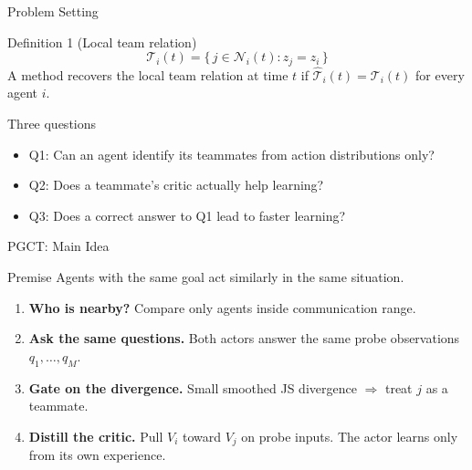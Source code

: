 \documentclass{beamer}
\begin{document}
\begin{frame}{Problem Setting}
  \begin{block}{Definition 1 (Local team relation)}
    \[
      \mathcal{T}_i(t) = \{\, j \in \mathcal{N}_i(t) : z_j = z_i \,\}
    \]
    A method recovers the local team relation at time $t$ if $\hat{\mathcal{T}}_i(t) = \mathcal{T}_i(t)$ for every agent $i$.
  \end{block}

  \begin{block}{Three questions}
    \begin{itemize}
      \item Q1: Can an agent identify its teammates from action distributions only?
      \item Q2: Does a teammate's critic actually help learning?
      \item Q3: Does a correct answer to Q1 lead to faster learning?
    \end{itemize}
  \end{block}
\end{frame}

\begin{frame}{PGCT: Main Idea}
  \begin{block}{Premise}
    Agents with the same goal act similarly in the same situation.
  \end{block}

  \begin{enumerate}
    \item \textbf{Who is nearby?} Compare only agents inside communication range.
    \item \textbf{Ask the same questions.} Both actors answer the same probe observations $q_1,\dots,q_M$.
    \item \textbf{Gate on the divergence.} Small smoothed JS divergence $\Rightarrow$ treat $j$ as a teammate.
    \item \textbf{Distill the critic.} Pull $V_i$ toward $V_j$ on probe inputs. The actor learns only from its own experience.
  \end{enumerate}
\end{frame}
\end{document}
